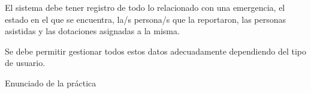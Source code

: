 {\reportauthors}
{El sistema debe tener registro de todo lo relacionado con una emergencia, el estado en el que se encuentra, la/s persona/s que la reportaron, las personas asistidas y las dotaciones asignadas a la misma. \par
Se debe permitir gestionar todos estos datos adecuadamente dependiendo del tipo de usuario.}
{}
{Enunciado de la práctica}

